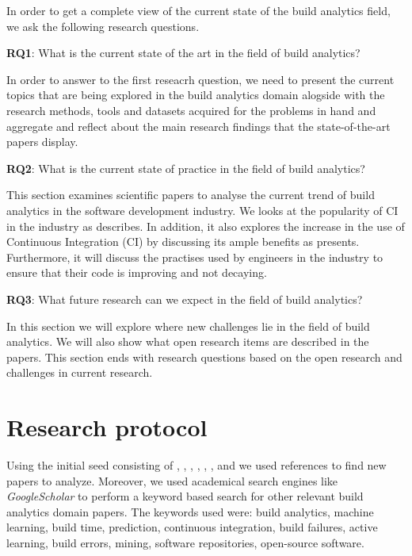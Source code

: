 \documentclass[]{book}
\begin{document}
In order to get a complete view of the current state of the build
analytics field, we ask the following research questions.

\textbf{RQ1}: What is the current state of the art in the field of build
analytics?

In order to answer to the first reseacrh question, we need to present
the current topics that are being explored in the build analytics domain
alogside with the research methods, tools and datasets acquired for the
problems in hand and aggregate and reflect about the main research
findings that the state-of-the-art papers display.

\textbf{RQ2}: What is the current state of practice in the field of
build analytics?

This section examines scientific papers to analyse the current trend of
build analytics in the software development industry. We looks at the
popularity of CI in the industry as \citet{hilton2016usage} describes.
In addition, it also explores the increase in the use of Continuous
Integration (CI) by discussing its ample benefits as
\citet{fowler2006continuous} presents. Furthermore, it will discuss the
practises used by engineers in the industry to ensure that their code is
improving and not decaying.

\textbf{RQ3}: What future research can we expect in the field of build
analytics?

In this section we will explore where new challenges lie in the field of
build analytics. We will also show what open research items are
described in the papers. This section ends with research questions based
on the open research and challenges in current research.

\section{Research protocol}\label{research-protocol-1}

Using the initial seed consisting of \citet{bird2017predicting},
\citet{beller2017oops}, \citet{rausch2017empirical},
\citet{beller2017travistorrent}, \citet{pinto2018work},
\citet{zhao2017impact}, \citet{widder2018m} and \citet{hilton2016usage}
we used references to find new papers to analyze. Moreover, we used
academical search engines like \emph{GoogleScholar} to perform a keyword
based search for other relevant build analytics domain papers. The
keywords used were: build analytics, machine learning, build time,
prediction, continuous integration, build failures, active learning,
build errors, mining, software repositories, open-source software.
\end{document}
